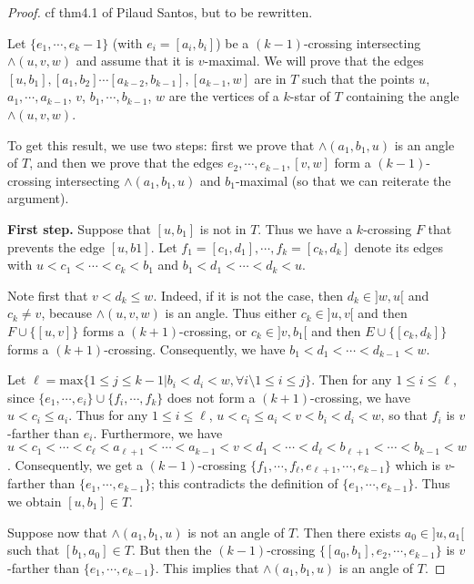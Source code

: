 \documentclass{amsart}
\theoremstyle{remark}
\begin{document}
\begin{proof}
cf thm4.1 of  Pilaud Santos, but to be rewritten.



Let $\{e_1, \cdots , e{_k-1}\}$ (with $e_i = [a_i, b_i]$) be a $(k - 1)$-crossing intersecting $\wedge(u, v, w)$ and assume that it is $v$-maximal. 
We will prove that the edges $[u, b_1],[a_1, b_2]\cdots[a_{k-2}, b_{k-1}], [a_{k-1}, w]$ are in $T$ such that the points $u$, $a_1,\cdots,a_{k-1}$, $v$, $b_1,\cdots,b_{k-1}$, $w$ are the vertices of a $k$-star of $T$ containing the angle $\wedge(u, v, w)$. 

To get this result, we use two steps: first we prove that $\wedge(a_1, b_1, u)$ is an angle of $T$, and then we prove that the edges $e_2,\cdots, e_{k-1}, [v, w]$ form a $(k-1)$-crossing intersecting $\wedge(a_1, b_1, u)$ and $b_1$-maximal (so that we can reiterate the argument).

{\bf First step.}
Suppose that $[u, b_1]$ is not in $T$. 
Thus we have a $k$-crossing $F$ that prevents the edge $[u, b1]$.
Let $f_1 = [c_1, d_1],\cdots, f_k = [c_k, d_k]$ denote its
edges with $u < c_1 < \cdots < c_k < b_1$ and $b_1 < d_1 < \cdots < d_k < u$.

Note first that $v < d_k \leq w$. Indeed, if it is not the case, then
$d_k \in ]w, u[$ and $c_k \neq v$, because $\wedge(u, v, w)$ is an angle. 
Thus either $c_k \in ]u, v[$ and then $F \cup \{[u, v]\}$ forms a $(k + 1)$-crossing, 
or $c_k \in ]v, b_1[$ and then $E \cup \{[c_k, d_k]\}$ forms a $(k + 1)$-crossing. 
Consequently, we have $b_1 < d_1 < \cdots < d_{k-1} < w$.

Let $\ell = \text{max}\{1 \leq j \leq k - 1 | b_i < d_i < w, \forall i \setminus 1 \leq i \leq j\}$.
Then for any $1 \leq i \leq \ell$, since $\{e_1, \cdots , e_i\} \cup \{f_i, \cdots , f_k\}$ does not form
a $(k + 1)$-crossing, we have $u < c_i \leq a_i$. Thus for any $1 \leq i \leq \ell$, $u < c_i \leq a_i < v < b_i < d_i < w$, so that $f_i$
is $v$-farther than $e_i$.
Furthermore, we have $u < c_1 < \cdots < c_\ell < a_{\ell+1} < \cdots < a_{k-1} < v < d_1 < \cdots < d_\ell < b_{\ell+1} < \cdots < b_{k-1} < w$. 
Consequently, we get a $(k - 1)$-crossing $\{f_1, \cdots , f_\ell
, e_{\ell+1}, \cdots , e_{k-1}\}$ which is $v$-farther than $\{e_1, \cdots , e_{k-1}\}$; this contradicts the definition of $\{e_1, \cdots , e_{k-1}\}$. 
Thus we obtain $[u, b_1] \in  T$.

Suppose now that $\wedge(a_1, b_1, u)$ is not an angle of $T$. 
Then there exists $a_0 \in ]u, a_1[$ such that $[b_1, a_0] \in  T$. 
But then the $(k - 1)$-crossing $\{[a_0, b_1], e_2, \cdots , e_{k-1}\}$ is $v$-farther than $\{e_1, \cdots , e_{k-1}\}$. 
This implies that $\wedge(a_1, b_1, u)$ is an angle of $T$.


\end{proof}
\end{document}
